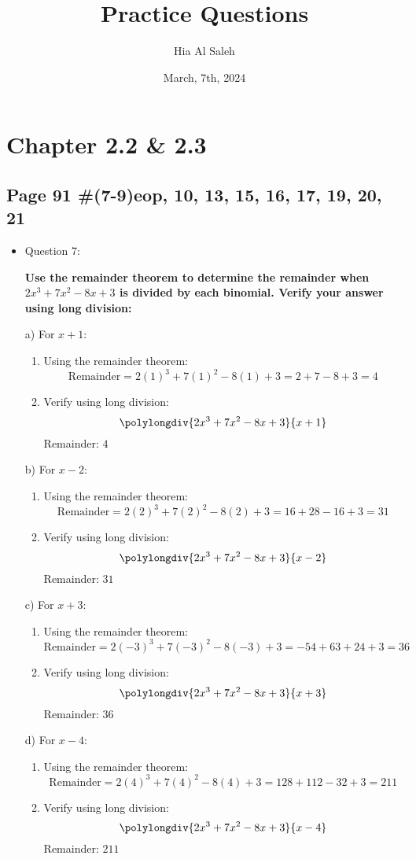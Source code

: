 \documentclass{article}
\title{Practice Questions}
\author{Hia Al Saleh}
\date{March, 7th, 2024}
\begin{document}
\maketitle
\section*{Chapter 2.2 \& 2.3}
\subsection*{Page 91 \#(7-9)eop, 10, 13, 15, 16, 17, 19, 20, 21}
\begin{itemize}
\item Question 7:

\textbf{Use the remainder theorem to determine the remainder when \(2x^3 + 7x^2 - 8x + 3\) is divided by each binomial. Verify your answer using long division:}

a) For \(x + 1\):
\begin{enumerate}
    \item Using the remainder theorem:
    \[
    \text{Remainder} = 2(1)^3 + 7(1)^2 - 8(1) + 3 = 2 + 7 - 8 + 3 = 4
    \]
    \item Verify using long division:
    \[
    \polylongdiv{2x^3 + 7x^2 - 8x + 3}{x + 1}
    \]
    Remainder: \(4\)
\end{enumerate}

b) For \(x - 2\):
\begin{enumerate}
    \item Using the remainder theorem:
    \[
    \text{Remainder} = 2(2)^3 + 7(2)^2 - 8(2) + 3 = 16 + 28 - 16 + 3 = 31
    \]
    \item Verify using long division:
    \[
    \polylongdiv{2x^3 + 7x^2 - 8x + 3}{x - 2}
    \]
    Remainder: \(31\)
\end{enumerate}

c) For \(x + 3\):
\begin{enumerate}
    \item Using the remainder theorem:
    \[
    \text{Remainder} = 2(-3)^3 + 7(-3)^2 - 8(-3) + 3 = -54 + 63 + 24 + 3 = 36
    \]
    \item Verify using long division:
    \[
    \polylongdiv{2x^3 + 7x^2 - 8x + 3}{x + 3}
    \]
    Remainder: \(36\)
\end{enumerate}

d) For \(x - 4\):
\begin{enumerate}
    \item Using the remainder theorem:
    \[
    \text{Remainder} = 2(4)^3 + 7(4)^2 - 8(4) + 3 = 128 + 112 - 32 + 3 = 211
    \]
    \item Verify using long division:
    \[
    \polylongdiv{2x^3 + 7x^2 - 8x + 3}{x - 4}
    \]
    Remainder: \(211\)
\end{enumerate}


\end{itemize}
\end{document}
